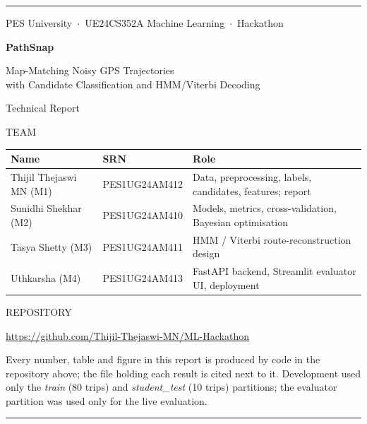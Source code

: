 \thispagestyle{fancy}
\markboth{}{}
\vspace*{6mm}
{\sffamily\color{accent}\rule{\textwidth}{2pt}\par}
\vspace{10mm}
{\sffamily\large\color{gray} PES University \,$\cdot$\, UE24CS352A Machine Learning \,$\cdot$\, Hackathon\par}
\vspace{6mm}
{\sffamily\fontsize{34}{40}\selectfont\bfseries\color{accent} PathSnap\par}
\vspace{3mm}
{\sffamily\fontsize{18}{24}\selectfont Map-Matching Noisy GPS Trajectories\\[2pt] with Candidate Classification and HMM/Viterbi Decoding\par}
\vspace{6mm}
{\sffamily\large Technical Report\par}
\vspace{14mm}
{\sffamily\small\color{gray} TEAM\par}
\vspace{2mm}
\begin{tabular}{@{}>{\raggedright\arraybackslash}p{42mm}>{\raggedright\arraybackslash}p{32mm}>{\raggedright\arraybackslash}p{80mm}@{}}
\toprule
\textbf{Name} & \textbf{SRN} & \textbf{Role} \\
\midrule
Thijil Thejaswi MN (M1) & PES1UG24AM412 & Data, preprocessing, labels, candidates, features; report \\
Sunidhi Shekhar (M2) & PES1UG24AM410 & Models, metrics, cross-validation, Bayesian optimisation \\
Tasya Shetty (M3) & PES1UG24AM411 & HMM / Viterbi route-reconstruction design \\
Uthkarsha (M4) & PES1UG24AM413 & FastAPI backend, Streamlit evaluator UI, deployment \\
\bottomrule
\end{tabular}
\vspace{12mm}

{\sffamily\small\color{gray} REPOSITORY\par}
\vspace{1mm}
\url{https://github.com/Thijil-Thejaswi-MN/ML-Hackathon}\par
\vfill
{\small\color{gray} Every number, table and figure in this report is produced by code in the repository above;
the file holding each result is cited next to it. Development used only the \emph{train} (80 trips) and
\emph{student\_test} (10 trips) partitions; the evaluator partition was used only for the live evaluation.\par}
\vspace{4mm}
{\sffamily\color{accent}\rule{\textwidth}{2pt}\par}
\newpage

